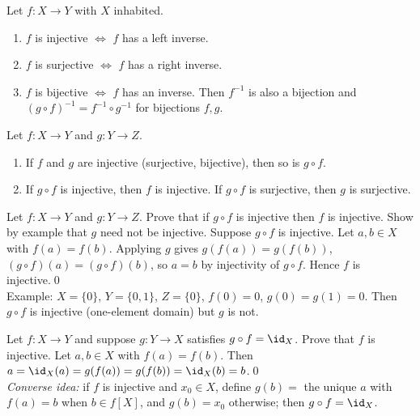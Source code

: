 \begin{result}
Let $f:X\to Y$ with $X$ inhabited.
\begin{enumerate}
\item $f$ is injective $\Leftrightarrow$ $f$ has a left inverse.
\item $f$ is surjective $\Leftrightarrow$ $f$ has a right inverse.
\item $f$ is bijective $\Leftrightarrow$ $f$ has an inverse. Then $f^{-1}$ is also a bijection and $(g\circ f)^{-1}=f^{-1}\circ g^{-1}$ for bijections $f,g$.
\end{enumerate}
\end{result}

\begin{result}[Composition]
Let $f:X\to Y$ and $g:Y\to Z$.
\begin{enumerate}
\item If $f$ and $g$ are injective (surjective, bijective), then so is $g\circ f$.
\item If $g\circ f$ is injective, then $f$ is injective. \quad If $g\circ f$ is surjective, then $g$ is surjective.
\end{enumerate}
\end{result}

\begin{hexample}
Let $f:X\to Y$ and $g:Y\to Z$. Prove that if $g\circ f$ is injective then $f$ is injective. Show by example that $g$ need not be injective.
\solution
Suppose $g\circ f$ is injective. Let $a,b\in X$ with $f(a)=f(b)$. Applying $g$ gives $g(f(a))=g(f(b))$, \ie $(g\circ f)(a)=(g\circ f)(b)$, so $a=b$ by injectivity of $g\circ f$. Hence $f$ is injective.\qed\\
Example: $X=\{0\}$, $Y=\{0,1\}$, $Z=\{0\}$, $f(0)=0$, $g(0)=g(1)=0$. Then $g\circ f$ is injective (one-element domain) but $g$ is not.
\end{hexample}

\begin{hexample}
Let $f:X\to Y$ and suppose $g:Y\to X$ satisfies $g\circ f=\id_X$. Prove that $f$ is injective.
\solution
Let $a,b\in X$ with $f(a)=f(b)$. Then $a=\id_X(a)=g(f(a))=g(f(b))=\id_X(b)=b$.\qed\\
\emph{Converse idea:} if $f$ is injective and $x_0\in X$, define $g(b)=$ the unique $a$ with $f(a)=b$ when $b\in f[X]$, and $g(b)=x_0$ otherwise; then $g\circ f=\id_X$.
\end{hexample}

